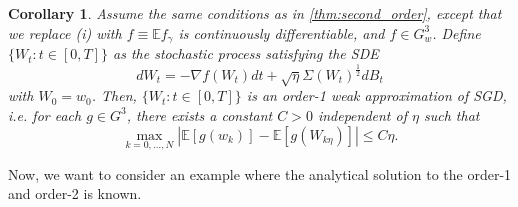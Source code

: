 \documentclass[12pt]{article}
\newtheorem{corollary}[theorem]{Corollary}
\theoremstyle{definition}
\numberwithin{equation}{section}
\newcommand{\E}{\mathbb{E}}
\newcommand{\ev}[1]{\mathbb{E}\left[{#1}\right]}
\begin{document}
\begin{corollary}
  \label{cor:first_order}
  Assume the same conditions as in \autoref{thm:second_order}, except that we replace (i) with $f \equiv \E f_{\gamma}$ is continuously differentiable, and $f \in G^3_w$.
  Define $\{W_t:t\in [0,T] \}$ as the stochastic process satisfying the SDE
  \begin{equation}
    \label{eq:first_order_sde}
    d W_t = -\nabla f(W_t) dt + \sqrt{\eta}\Sigma(W_t)^{\frac{1}{2}}dB_t
  \end{equation}
  with $W_0 = w_0$. Then, $\{W_t:t\in [0,T] \}$ is an order-1 weak approximation of SGD, i.e. for each $g \in G^3$, there exists a constant $C > 0$ independent of $\eta$ such that
  \begin{equation}
    \max_{k=0,\dots,N} |\ev{g(w_k)} - \ev{g(W_{k\eta})}| \leq C \eta.
  \end{equation}
\end{corollary}
Now, we want to consider an example where the analytical solution to the order-1 and order-2 is known.
\end{document}
